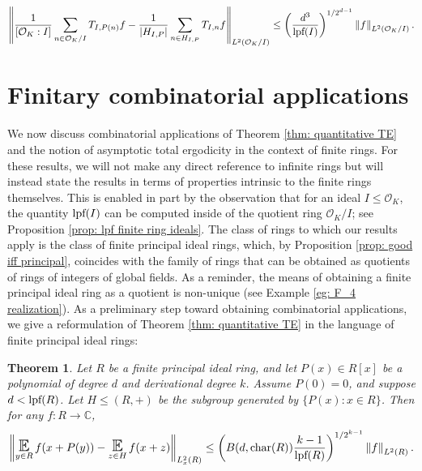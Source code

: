 \documentclass{amsart}
\newtheorem{theorem}{Theorem}[section]
\theoremstyle{definition}
\numberwithin{equation}{section}
\newcommand{\C}{\mathbb{C}}
\newcommand{\mO}{\mathcal{O}}
\newcommand{\lpf}{\normalfont\text{lpf}}
\DeclareMathOperator*{\E}{\text{\Large $\mathbb{E}$}}
\newcommand{\norm}[2]{\left\| #2 \right\|_{#1}}
\begin{document}
\begin{equation*}
    \norm{L^2(\mO_K/I)}{\frac{1}{[\mO_K:I]}\sum_{n \in \mO_K/I} T_{I,P(n)} f - \frac{1}{|H_{I,P}|} \sum_{n \in H_{I,P}} T_{I,n} f} \le \left( \frac{d^3}{\lpf(I)} \right)^{1/2^{d-1}} \norm{L^2(\mO_K/I)}{f}.
\end{equation*}


\section{Finitary combinatorial applications} \label{sec:finitary applications}

We now discuss combinatorial applications of Theorem \ref{thm: quantitative TE} and the notion of asymptotic total ergodicity in the context of finite rings.
For these results, we will not make any direct reference to infinite rings but will instead state the results in terms of properties intrinsic to the finite rings themselves.
This is enabled in part by the observation that for an ideal $I \le \mO_K$, the quantity $\lpf(I)$ can be computed inside of the quotient ring $\mO_K/I$; see Proposition \ref{prop: lpf finite ring ideals}.
The class of rings to which our results apply is the class of finite principal ideal rings, which, by Proposition \ref{prop: good iff principal}, coincides with the family of rings that can be obtained as quotients of rings of integers of global fields.
As a reminder, the means of obtaining a finite principal ideal ring as a quotient is non-unique (see Example \ref{eg: F_4 realization}).
As a preliminary step toward obtaining combinatorial applications, we give a reformulation of Theorem \ref{thm: quantitative TE} in the language of finite principal ideal rings:

\begin{theorem} \label{thm: finite ring polynomial average}
	Let $R$ be a finite principal ideal ring, and let $P(x) \in R[x]$ be a polynomial of degree $d$ and derivational degree $k$.
    Assume $P(0) = 0$, and suppose $d < \lpf(R)$.
	Let $H \le (R, +)$ be the subgroup generated by $\{P(x) : x \in R\}$.
	Then for any $f : R \to \C$,
	\begin{equation} \label{eq: polynomial equidistribution}
		\norm{L^2_x(R)}{\E_{y \in R} f(x + P(y)) - \E_{z \in H} f(x + z)} \le \left( B(d,\textup{char}(R)) \frac{k-1}{\lpf(R)} \right)^{1/2^{k-1}} \norm{L^2(R)}{f}.
	\end{equation}
\end{theorem}
\end{document}
